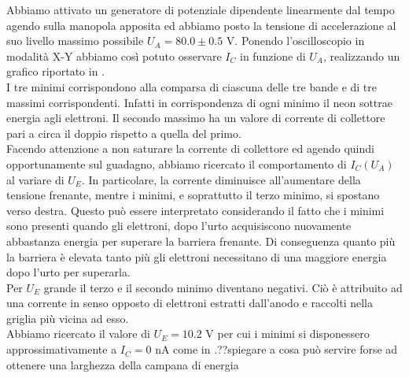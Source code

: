 Abbiamo attivato un generatore di potenziale dipendente linearmente dal tempo agendo sulla manopola apposita ed abbiamo posto la tensione di accelerazione al suo livello massimo possibile $U_A = 80.0 \pm 0.5$ V. Ponendo l'oscilloscopio in modalità X-Y abbiamo così potuto osservare $I_C$ in funzione di $U_A$, realizzando un grafico riportato in . \\
I tre minimi corrispondono alla comparsa di ciascuna delle tre bande e di tre massimi corrispondenti. Infatti in corrispondenza di ogni minimo il neon sottrae energia agli elettroni. Il secondo massimo ha un valore di corrente di collettore pari a circa il doppio rispetto a quella del primo.\\
Facendo attenzione a non saturare la corrente di collettore ed agendo quindi opportunamente sul guadagno, abbiamo ricercato il comportamento di $I_C(U_A)$ al variare di $U_E$. In particolare, la corrente diminuisce all'aumentare della tensione frenante, mentre i minimi, e soprattutto il terzo minimo, si spostano verso destra. Questo può essere interpretato considerando il fatto che i minimi sono presenti quando gli elettroni, dopo l'urto acquisiscono nuovamente abbastanza energia per superare la barriera frenante. Di conseguenza quanto più la barriera è elevata tanto più gli elettroni necessitano di una maggiore energia dopo l'urto per superarla.\\ 
Per $U_E$ grande il terzo e il secondo minimo diventano negativi. Ciò è attribuito ad una corrente in senso opposto di elettroni estratti dall'anodo e raccolti nella griglia più vicina ad esso.\\
Abbiamo ricercato il valore di $U_E = 10.2$ V per cui i minimi si disponessero approssimativamente a $I_C = 0$ nA come in .??spiegare a cosa può servire forse ad ottenere una larghezza della campana di energia\\
